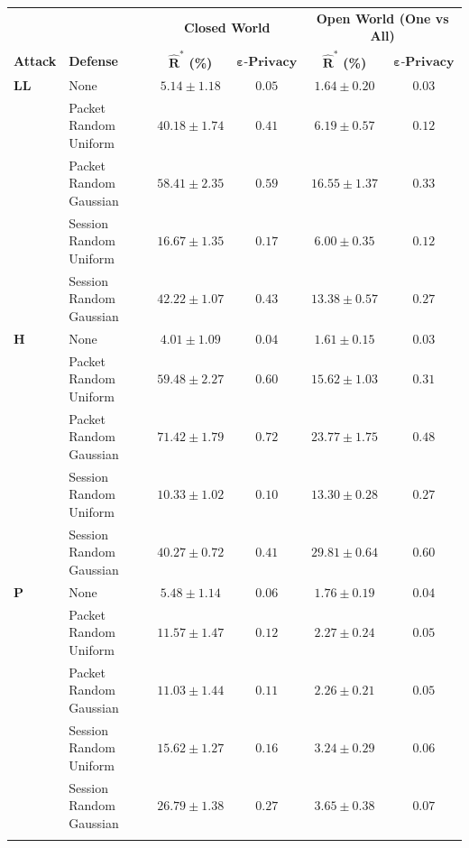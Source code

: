 \documentclass[
	ruledheaders=chapter,
	class=report,
	thesis={type=master, department=inf},
	accentcolor=1c,
	custommargins=true,
	marginpar=false,
	parskip=half-,
	fontsize=11pt,
]{tudapub}
\begin{document}
	\begin{table}
		\centering
		\small
		\begin{tabular}{llcccc}
			\toprule 
			& & \multicolumn{2}{c}{\textbf{Closed World}} & \multicolumn{2}{c}{\textbf{Open World (One vs All)}} \\
			\textbf{Attack} & \textbf{Defense} & $\mathbf{\widehat{R}^*}$ \textbf{(\%)} & $\mathbf{\varepsilon}\textbf{-Privacy}$ & $\mathbf{\widehat{R}^*}$ \textbf{(\%)} & $\mathbf{\varepsilon}\textbf{-Privacy}$ \\
			\midrule
			\textbf{LL} & None & $5.14 \pm 1.18$ & $0.05$ & $1.64 \pm 0.20$ & $0.03$ \\
			 & Packet Random Uniform & $40.18 \pm 1.74$ & $0.41$ & $6.19 \pm 0.57$ & $0.12$ \\
			 & Packet Random Gaussian & $\mathbf{58.41 \pm 2.35}$ & $\mathbf{0.59}$ & $\mathbf{16.55 \pm 1.37}$ & $\mathbf{0.33}$ \\
			 & Session Random Uniform & $16.67 \pm 1.35$ & $0.17$ & $6.00 \pm 0.35$ & $0.12$ \\
			 & Session Random Gaussian & $42.22 \pm 1.07$ & $0.43$ & $13.38 \pm 0.57$ & $0.27$ \\ \addlinespace
			 
		    \textbf{H} & None & $4.01 \pm 1.09$ & $0.04$ & $1.61 \pm 0.15$ & $0.03$ \\
			 & Packet Random Uniform & $59.48 \pm 2.27$ & $0.60$ & $15.62 \pm 1.03$ & $0.31$ \\
			 & Packet Random Gaussian & $\mathbf{71.42 \pm 1.79}$ & $\mathbf{0.72}$ & $23.77 \pm 1.75$ & $0.48$ \\
			 & Session Random Uniform & $10.33 \pm 1.02$ & $0.10$ & $13.30 \pm 0.28$ & $0.27$ \\
			 & Session Random Gaussian & $40.27 \pm 0.72$ & $0.41$ & $\mathbf{29.81 \pm 0.64}$ & $\mathbf{0.60}$ \\ \addlinespace
			 
			\textbf{P} & None & $5.48 \pm 1.14$ & $0.06$ & $1.76 \pm 0.19$ & $0.04$ \\
			 & Packet Random Uniform & $11.57 \pm 1.47$ & $0.12$ & $2.27 \pm 0.24$ & $0.05$ \\
			 & Packet Random Gaussian & $11.03 \pm 1.44$ & $0.11$ & $2.26 \pm 0.21$ & $0.05$ \\
			 & Session Random Uniform & $15.62 \pm 1.27$ & $0.16$ & $3.24 \pm 0.29$ & $0.06$ \\
			 & Session Random Gaussian & $\mathbf{26.79 \pm 1.38}$ & $\mathbf{0.27}$ & $\mathbf{3.65 \pm 0.38}$ & $\mathbf{0.07}$ \\ \addlinespace
			 

\end{tabular}
\end{table}
\end{document}
